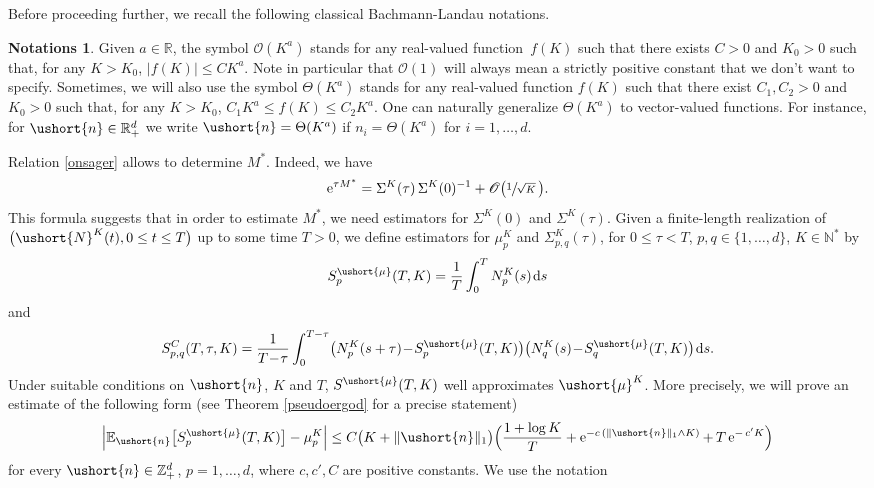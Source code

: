 \documentclass[JEP,XML,SOM,Unicode]{cedram}
\let\mathcal\mathscr
\numberwithin{equation}{section}
\theoremstyle{plain}
\theoremstyle{definition}
\newtheorem*{notations}{Notations}
\newcommand{\E}{{\mathbb{E}}}
\newcommand{\real}{\mathbb{R}}
\newcommand{\zentiers}{{\mathbb{Z}}}
\newcommand{\domaine}{\zentiers_{+}^{d}}
\newcommand{\rpd}{\mathbb{R}_+^d}
\newcommand{\Oun}{\mathcal{O}(1)}
\newcommand{\sK}{K}
\newcommand{\vecn}{\ushort{n}}
\newcommand{\vmu}{\ushort{\mu}}
\newcommand{\leproc}{\ushort{N}^{K}}
\newcommand{\e}{\operatorname{e}}
\newcommand{\dd}{\hspace{1pt}\mathrm{d}}
\newcommand{\norm}[1]{\|#1\|_{1}}\let\snorm\norm
\begin{document}
Before proceeding further, we recall the following classical Bachmann-Landau notations.
\begin{notations}
Given $a\in\real$, the symbol $\mathcal{O}(K^a)$ stands for any real-valued function~$f(K)$ such that
there exists $C>0$ and $K_0>0$ such that, for any $K>K_0$, $|f(K)|\leq C K^a$. Note in particular that $\Oun$ will always mean a strictly positive constant that we don't want to specify.
Sometimes, we will also use the symbol $\Theta(K^a)$ stands for any real-valued function $f(K)$ such that there exist $C_1,C_2>0$ and $K_0>0$
such that, for any $K>K_0$, $C_1 K^a\leq f(K)\leq C_2 K^a$. One can naturally generalize $\Theta(K^a)$ to vector-valued functions. For instance, for $
\vecn\in\rpd$ we write $\vecn=\Theta(K^a)$ if $n_i=\Theta(K^a)$ for $i=1,\ldots,d$.
\end{notations}
Relation \eqref{onsager} allows to determine $M^*$. Indeed, we have
\begin{equation}\label{matrix-onsager}
\e^{\tau M^*} = \Sigma^{\sK}(\tau)\,\Sigma^{\sK}(0)^{-1} + \mathcal{O}\bigl(\sfrac{1}{\sqrt{K}}\,\bigr).
\end{equation}
This formula suggests that in order to estimate $M^*$, we need estimators for $\Sigma^{\sK}(0)$ and $\Sigma^{\sK}(\tau)$.
Given a finite-length realization of $\bigl(\leproc(t), 0\le t\le T\bigr)$ up to some time $T>0$, we define estimators for
$\mu_{p}^{\sK}$ and $\Sigma^{\sK}_{p,q}(\tau)$,
for $0\le \tau<T$, $p,q\in\{1,\ldots, d\}$, $K\in \mathbb{N}^*$ by
\begin{equation}
\label{stat-mu}
S^{\vmu}_{p}(T,K) =\frac{1}{T}\int_{0}^{T}N_{p}^{\sK}(s) \dd s
\end{equation}
and
\begin{equation}\label{stat-sigma}
S^{C}_{p,q}(T,\tau,K) =\frac{1}{T\!-\!\tau}\int_{0}^{T-\tau}\bigl(N_{p}^{\sK}(s+\tau)\!-\!S^{\vmu}_{p}(T,K)\bigr)
\bigl(N_{q}^{\sK}(s)\!-\!S^{\vmu}_{q}(T,K)\bigr)\dd s.
\end{equation}
Under suitable conditions on $\vecn$, $K$ and $T$, $S^{\vmu}(T,K)$ well approximates $\vmu^{\sK}$.
More precisely, we will prove an estimate of the following form (see Theorem \ref{pseudoergod} for a precise statement)
\begin{equation}\label{control-est-mu}
\left|\E_{\vecn}\bigl[S^{\vmu}_{p}(T,K)\bigr]-\mu_p^{\sK}\right| \leq C\bigl(K+\norm{\vecn}\bigr)\Bigl(\frac{1+\log K}{T} + \e^{-c\,(\|\vecn\|_{1}\wedge K)}+\, T\e^{-\,c' K} \Bigr)
\end{equation}
for every $\vecn\in\domaine$, $p=1,\ldots,d$, where $c,c',C$ are positive constants. We use the notation
\end{document}
